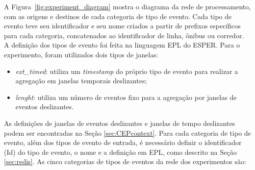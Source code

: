A Figura~\ref{fig:experiment_diagram} mostra o diagrama da rede de processamento, com as origens e destinos de cada categoria de tipo de evento. %
Cada tipo de evento teve seu identificador
e seu nome criados a partir de prefixos específicos para cada categoria, concatenados ao identificador de linha, ônibus ou corredor.
A definição dos tipos de evento foi feita na linguagem EPL do ESPER. 
Para o experimento, foram utilizados dois tipos de janelas:


\begin{itemize}
    \item \textit{ext\_timed}: utiliza um \textit{timestamp} do próprio tipo de evento para realizar a agregação em janelas temporais deslizantes;
    \item \textit{lenght}: utiliza um número de eventos fixo para a agregação por janelas de eventos deslizantes.
\end{itemize}
As definições de janelas de eventos deslizantes e janelas de tempo deslizantes podem ser encontradas na Seção \ref{sec:CEPcontext}. Para cada categoria de tipo de evento, além dos tipos de evento de entrada, é necessário definir o identificador (Id) do tipo de evento, o nome e a definição em EPL, como descrito na Seção \ref{sec:redis}. As cinco categorias de tipos de eventos da rede dos experimentos são: 

